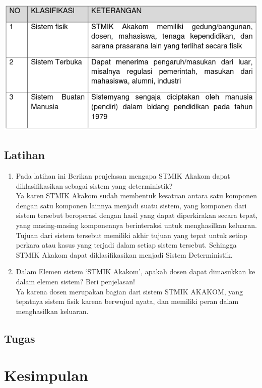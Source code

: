 \documentclass[a4paper,12pt]{article}
\begin{document}
\begin{center}
    \includegraphics[width=\textwidth]{tbl2}
\end{center}

\newpage
\subsection{Latihan}
\begin{enumerate}
   \item Pada latihan ini Berikan penjelasan mengapa STMIK Akakom dapat diklasifikasikan sebagai sistem yang
       deterministik?\\
        Ya karen STMIK Akakom sudah membentuk kesatuan antara satu komponen dengan satu komponen lainnya menjadi suatu
        sistem, yang komponen dari sistem tersebut beroperasi dengan hasil yang dapat diperkirakan
        secara tepat, yang masing-masing komponennya berinteraksi untuk menghasilkan keluaran. Tujuan dari sistem
        tersebut memiliki akhir tujuan yang tepat untuk setiap perkara atau kasus yang terjadi dalam setiap sistem
        tersebut. Sehingga STMIK Akakom dapat diklasifikasikan menjadi Sistem Deterministik.
    \item Dalam Elemen sistem ‘STMIK Akakom’, apakah dosen dapat dimasukkan ke dalam elemen sistem? Beri penjelasan!\\
        Ya karena dosen merupakan bagian dari sistem STMIK AKAKOM, yang tepatnya sistem fisik karena berwujud nyata, dan
        memiliki peran dalam menghasilkan keluaran.
\end{enumerate}

\subsection{Tugas}

\section{Kesimpulan}
\end{document}
